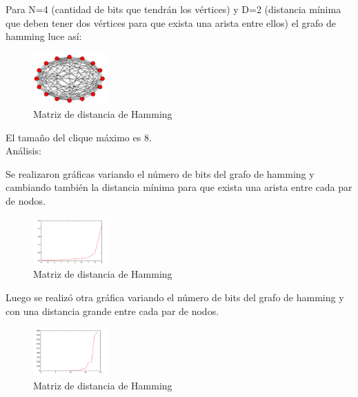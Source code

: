 \documentclass[conference,compsoc]{IEEEtran}
\begin{document}
{Para N=4 (cantidad de bits que tendrán los vértices) y D=2 (distancia mínima que deben tener dos vértices para que exista una arista entre ellos) el grafo de hamming luce así:
\begin{figure}[h] 
    \centering
    \includegraphics[width=0.25\textwidth]{Problema3/p31.png}
    \caption{Matriz de distancia de Hamming}
    \label{fig:mesh1}
\end{figure}

El tamaño del clique máximo es 8.
$$$$
Análisis:

Se realizaron gráficas variando el número de bits del grafo de hamming y cambiando también la distancia mínima para que exista una arista entre cada par de nodos.
\begin{figure}[h] 
    \centering
    \includegraphics[width=0.25\textwidth]{Problema3/p32.PNG}
    \caption{Matriz de distancia de Hamming}
    \label{fig:mesh1}
\end{figure}

Luego se realizó otra gráfica variando el número de bits del grafo de hamming y con una distancia grande entre cada par de nodos.
\begin{figure}[h] 
    \centering
    \includegraphics[width=0.25\textwidth]{Problema3/P33.PNG}
    \caption{Matriz de distancia de Hamming}
    \label{fig:mesh1}
\end{figure}
\begin{thebibliography}{1}


\end{thebibliography}}
\end{document}
